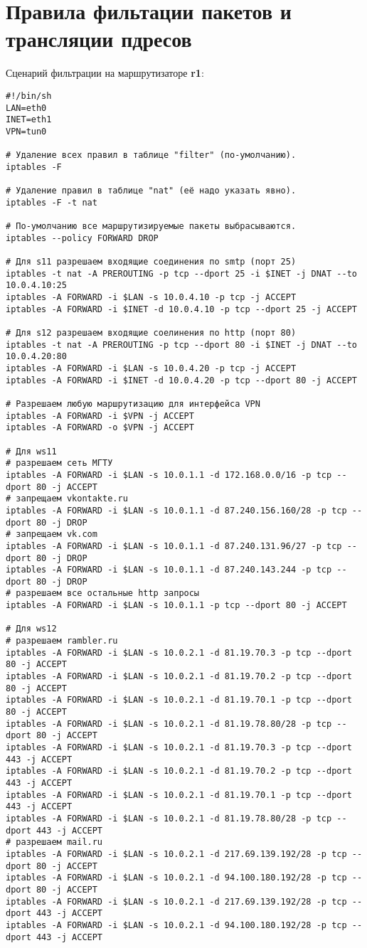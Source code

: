 \documentclass[a4paper,12pt]{article}
\begin{document}
\section{Правила фильтации пакетов и трансляции пдресов}

Сценарий фильтрации на маршрутизаторе \textbf{r1}:

\begin{Verbatim}
#!/bin/sh
LAN=eth0
INET=eth1
VPN=tun0

# Удаление всех правил в таблице "filter" (по-умолчанию).
iptables -F

# Удаление правил в таблице "nat" (её надо указать явно).
iptables -F -t nat

# По-умолчанию все маршрутизируемые пакеты выбрасываются.
iptables --policy FORWARD DROP

# Для s11 разрешаем входящие соединения по smtp (порт 25)
iptables -t nat -A PREROUTING -p tcp --dport 25 -i $INET -j DNAT --to 10.0.4.10:25
iptables -A FORWARD -i $LAN -s 10.0.4.10 -p tcp -j ACCEPT
iptables -A FORWARD -i $INET -d 10.0.4.10 -p tcp --dport 25 -j ACCEPT

# Для s12 разрешаем входящие соелинения по http (порт 80)
iptables -t nat -A PREROUTING -p tcp --dport 80 -i $INET -j DNAT --to 10.0.4.20:80
iptables -A FORWARD -i $LAN -s 10.0.4.20 -p tcp -j ACCEPT
iptables -A FORWARD -i $INET -d 10.0.4.20 -p tcp --dport 80 -j ACCEPT

# Разрешаем любую маршрутизацию для интерфейса VPN
iptables -A FORWARD -i $VPN -j ACCEPT
iptables -A FORWARD -o $VPN -j ACCEPT

# Для ws11
# разрешаем сеть МГТУ
iptables -A FORWARD -i $LAN -s 10.0.1.1 -d 172.168.0.0/16 -p tcp --dport 80 -j ACCEPT
# запрещаем vkontakte.ru
iptables -A FORWARD -i $LAN -s 10.0.1.1 -d 87.240.156.160/28 -p tcp --dport 80 -j DROP
# запрещаем vk.com
iptables -A FORWARD -i $LAN -s 10.0.1.1 -d 87.240.131.96/27 -p tcp --dport 80 -j DROP
iptables -A FORWARD -i $LAN -s 10.0.1.1 -d 87.240.143.244 -p tcp --dport 80 -j DROP
# разрешаем все остальные http запросы
iptables -A FORWARD -i $LAN -s 10.0.1.1 -p tcp --dport 80 -j ACCEPT

# Для ws12
# разрешаем rambler.ru
iptables -A FORWARD -i $LAN -s 10.0.2.1 -d 81.19.70.3 -p tcp --dport 80 -j ACCEPT
iptables -A FORWARD -i $LAN -s 10.0.2.1 -d 81.19.70.2 -p tcp --dport 80 -j ACCEPT
iptables -A FORWARD -i $LAN -s 10.0.2.1 -d 81.19.70.1 -p tcp --dport 80 -j ACCEPT
iptables -A FORWARD -i $LAN -s 10.0.2.1 -d 81.19.78.80/28 -p tcp --dport 80 -j ACCEPT
iptables -A FORWARD -i $LAN -s 10.0.2.1 -d 81.19.70.3 -p tcp --dport 443 -j ACCEPT
iptables -A FORWARD -i $LAN -s 10.0.2.1 -d 81.19.70.2 -p tcp --dport 443 -j ACCEPT
iptables -A FORWARD -i $LAN -s 10.0.2.1 -d 81.19.70.1 -p tcp --dport 443 -j ACCEPT
iptables -A FORWARD -i $LAN -s 10.0.2.1 -d 81.19.78.80/28 -p tcp --dport 443 -j ACCEPT
# разрешаем mail.ru
iptables -A FORWARD -i $LAN -s 10.0.2.1 -d 217.69.139.192/28 -p tcp --dport 80 -j ACCEPT
iptables -A FORWARD -i $LAN -s 10.0.2.1 -d 94.100.180.192/28 -p tcp --dport 80 -j ACCEPT
iptables -A FORWARD -i $LAN -s 10.0.2.1 -d 217.69.139.192/28 -p tcp --dport 443 -j ACCEPT
iptables -A FORWARD -i $LAN -s 10.0.2.1 -d 94.100.180.192/28 -p tcp --dport 443 -j ACCEPT



\end{Verbatim}
\end{document}
